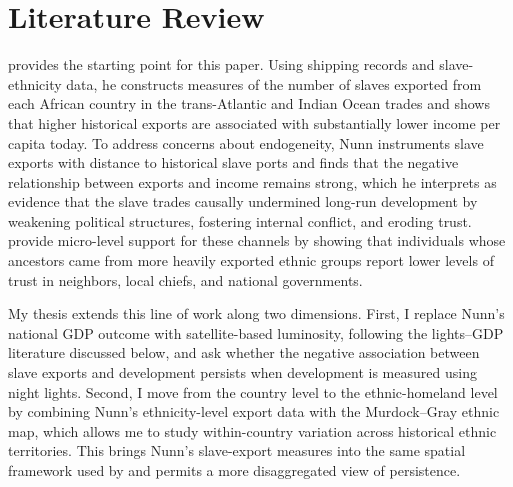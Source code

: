 \documentclass[12pt]{article}
\begin{document}
\section{Literature Review}
\label{sec:lit}

\citet{nunn2008} provides the starting point for this paper. Using shipping records and slave-ethnicity data, he constructs measures of the number of slaves exported from each African country in the trans-Atlantic and Indian Ocean trades and shows that higher historical exports are associated with substantially lower income per capita today. To address concerns about endogeneity, Nunn instruments slave exports with distance to historical slave ports and finds that the negative relationship between exports and income remains strong, which he interprets as evidence that the slave trades causally undermined long-run development by weakening political structures, fostering internal conflict, and eroding trust. \citet{nunnwantchekon2011} provide micro-level support for these channels by showing that individuals whose ancestors came from more heavily exported ethnic groups report lower levels of trust in neighbors, local chiefs, and national governments.

My thesis extends this line of work along two dimensions. First, I replace Nunn's national GDP outcome with satellite-based luminosity, following the lights--GDP literature discussed below, and ask whether the negative association between slave exports and development persists when development is measured using night lights. Second, I move from the country level to the ethnic-homeland level by combining Nunn's ethnicity-level export data with the Murdock--Gray ethnic map, which allows me to study within-country variation across historical ethnic territories. This brings Nunn's slave-export measures into the same spatial framework used by \citet{michalopoulospapaioannou2013} and permits a more disaggregated view of persistence.
\end{document}
